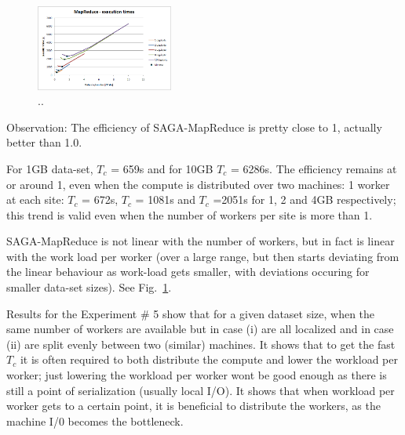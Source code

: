 \documentclass[conference,final]{IEEEtran}
\newcommand{\sagamapreduce }{SAGA-MapReduce }
\newcommand{\tc }{ $T_c$ }
\begin{document}
\begin{figure}[t]
\includegraphics[width=0.4\textwidth]{MapReduce_local_executiontimeperworkerdatasize.png}
\caption{..}
\label{grids2}
\end{figure}

Observation: The efficiency of \sagamapreduce is pretty close to 1,
actually better than 1.0.

For 1GB data-set, \tc = 659s and for 10GB \tc = 6286s.  The efficiency
remains at or around 1, even when the compute is distributed over two
machines: 1 worker at each site: \tc = 672s, \tc = 1081s and \tc =2051s for
1, 2 and 4GB respectively; this trend is valid even when the number of
workers per site is more than 1.



\sagamapreduce is not linear with the number of workers, but in fact
is linear with the work load per worker (over a large range, but then starts deviating from the linear behaviour as work-load gets smaller, with deviations
occuring for smaller data-set sizes). See Fig.~\ref{grids2}.

Results for the Experiment \# 5 show that for a given dataset size,
when the same number of workers are available but in case (i) are all
localized and in case (ii) are split evenly between two (similar)
machines. It shows that to get the fast \tc it is often required to
both distribute the compute and lower the workload per worker; just
lowering the workload per worker wont be good enough as there is still
a point of serialization (usually local I/O).  It shows that when
workload per worker gets to a certain point, it is beneficial
to distribute the workers, as the machine I/0 becomes the bottleneck.
\end{document}
